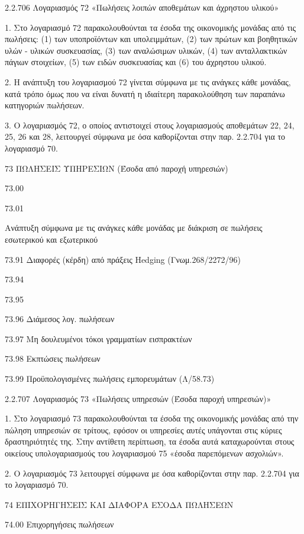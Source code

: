 \documentclass[A4,10pt,greek]{book}
\begin{document}
2.2.706 Λογαριασμός 72 «Πωλήσεις λοιπών αποθεμάτων και άχρηστου υλικού»

1. Στο λογαριασμό 72 παρακολουθούνται τα έσοδα της οικονομικής μονάδας από τις πωλήσεις: (1) των υποπροϊόντων και υπολειμμάτων, (2) των πρώτων και βοηθητικών υλών - υλικών συσκευασίας, (3) των αναλώσιμων υλικών, (4) των ανταλλακτικών πάγιων στοιχείων, (5) των ειδών συσκευασίας και (6) του άχρηστου υλικού.

2. Η ανάπτυξη του λογαριασμού 72 γίνεται σύμφωνα με τις ανάγκες κάθε μονάδας, κατά τρόπο όμως που να είναι δυνατή η ιδιαίτερη παρακολούθηση των παραπάνω κατηγοριών πωλήσεων.

3. Ο λογαριασμός 72, ο οποίος αντιστοιχεί στους λογαριασμούς αποθεμάτων 22, 24, 25, 26 και 28, λειτουργεί σύμφωνα με όσα καθορίζονται στην παρ. 2.2.704 για το λογαριασμό 70.

73    ΠΩΛΗΣΕΙΣ ΥΠΗΡΕΣΙΩΝ (Έσοδα από παροχή υπηρεσιών) 

        73.00

        73.01

                     Ανάπτυξη σύμφωνα με τις ανάγκες κάθε μονάδας με διάκριση
                     σε πωλήσεις εσωτερικού και εξωτερικού

        73.91    Διαφορές (κέρδη) από πράξεις Hedging (Γνωμ.268/2272/96) 

        73.94

        73.95

        73.96    Διάμεσος λογ. πωλήσεων

        73.97    Μη δουλευμένοι τόκοι γραμματίων εισπρακτέων

        73.98    Εκπτώσεις πωλήσεων

        73.99    Προϋπολογισμένες πωλήσεις εμπορευμάτων (Λ/58.73)

2.2.707 Λογαριασμός 73 «Πωλήσεις υπηρεσιών (Έσοδα παροχή υπηρεσιών)»

1. Στο λογαριασμό 73 παρακολουθούνται τα έσοδα της οικονομικής μονάδας από την πώληση υπηρεσιών σε τρίτους, εφόσον οι υπηρεσίες αυτές υπάγονται στις κύριες δραστηριότητές της. Στην αντίθετη περίπτωση, τα έσοδα αυτά καταχωρούνται στους οικείους υπολογαριασμούς του λογαριασμού 75 «έσοδα παρεπόμενων ασχολιών».

2. Ο λογαριασμός 73 λειτουργεί σύμφωνα με όσα καθορίζονται στην παρ. 2.2.704 για το λογαριασμό 70.

 74    ΕΠΙΧΟΡΗΓΗΣΕΙΣ ΚΑΙ ΔΙΑΦΟΡΑ ΕΣΟΔΑ ΠΩΛΗΣΕΩΝ

        74.00    Επιχορηγήσεις πωλήσεων 
\end{document}
